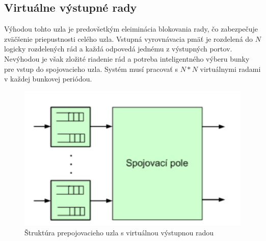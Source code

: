 \subsection{Virtuálne výstupné rady}
Výhodou tohto uzla je predovšetkým eleiminácia blokovania rady, čo zabezpečuje zväčšenie priepustnosti celého uzla. Vstupná vyrovnávacia pmäť je rozdelená do $N$ logicky rozdelených rád a každá odpovedá jednému z výstupných portov. Nevýhodou je však zložité riadenie rád a potreba inteligentného výberu bunky pre vstup do spojovacieho uzla. Systém musí pracovať s $N*N$ virtuálnymi radami v každej bunkovej periódou.

\begin{figure}[ht]
\centering
  \begin{center}
    \includegraphics[scale=0.8]{BPC-HWS/images/propoj_virt.png}
  \end{center}
  \caption[Štruktúra prepojovacieho uzla s virtuálnou výstupnou radou]{Štruktúra prepojovacieho uzla s virtuálnou výstupnou radou}
\end{figure}